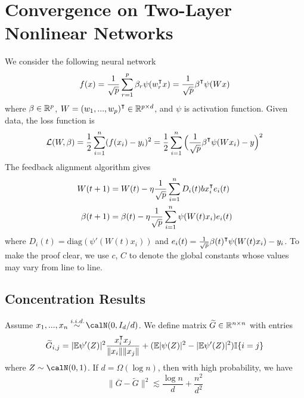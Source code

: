 
\section{Convergence on Two-Layer Nonlinear Networks}\label{sec:appendix-convergence}
We consider the following neural network
\begin{equation}
f(x) = \frac{1}{\sqrt p}\sum_{r=1}^p \beta_r \psi(w_r\transpose x) = \frac{1}{\sqrt p}\beta\transpose \psi(Wx)
\end{equation}
where $\beta \in \mathbb{R}^p$, $W = (w_1,...,w_p)\transpose\in\R^{p\times d}$, and $\psi$ is activation function. Given data, the loss function is
\begin{equation}
\Loss(W, \beta) = \frac{1}{2}\sum_{i=1}^n(f(x_i)-y_i)^2 = \frac{1}{2}\sum_{i=1}^n\Big(\frac{1}{\sqrt p}\beta\transpose \psi(Wx_i)-y\Big)^2
\end{equation}
The feedback alignment algorithm gives
\begin{equation}
\label{eq:updates}
\begin{aligned}
    W(t+1) &= W(t) - \eta\frac{1}{\sqrt p}\sum_{i=1}^nD_i(t)bx_i\transpose e_i(t) \\
    \beta(t+1) &= \beta(t)- \eta \frac{1}{\sqrt p}\sum_{i=1}^n \psi(W(t)x_i)e_i(t)
\end{aligned}
\end{equation}
where $D_i(t) = \text{diag}(\psi'(W(t)x_i))$ and $e_i(t) = \frac{1}{\sqrt p}\beta(t)\transpose \psi(W(t)x_i)-y_i$. To make the proof clear, we use $c$, $C$ to denote the global constants whose values may vary from line to line.

\subsection{Concentration Results}

\begin{lemma}\label{lma:G}
Assume $x_1,...,x_n \overset{\iid}{\sim} \calN(0,I_d/d)$. We define  matrix $\widetilde{G}\in \mathbb{R}^{n\times n}$ with entries
\begin{equation*}
    \widetilde{G}_{i,j} = |\E\psi'(Z)|^2 \frac{x_i\transpose x_j}{\|x_i\|\|x_j\|} + (\E|\psi(Z)|^2-|\E\psi'(Z)|^2)\I\{i=j\}
\end{equation*}
where $Z\sim \calN(0,1)$. If $d = \Omega(\log n)$, then with high probability, we have
\begin{equation*}
\|\overline{G}-\widetilde{G}\|^2 \lesssim \frac{\log n}{d} + \frac{n^2}{d^2}
\end{equation*}
\end{lemma}


